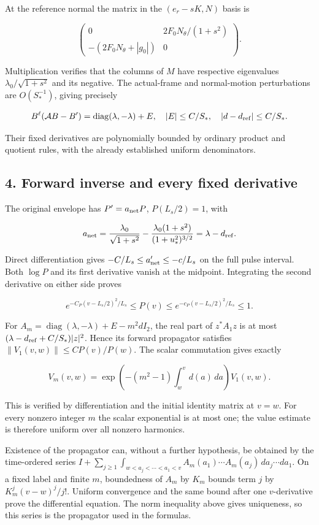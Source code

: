 \documentclass[10pt,a4paper]{article}
\begin{document}
At the reference normal the matrix in the \((e_r-sK,N)\) basis is

\[
\begin{pmatrix}0&2F_0N_\theta/(1+s^2)\\-(2F_0N_\theta+|g_0|)&0\end{pmatrix}.
\]

Multiplication verifies that the columns of \(M\) have respective eigenvalues \(\lambda_0/\sqrt{1+s^2}\) and its negative. The actual-frame and normal-motion perturbations are \(O(S_*^{-1})\), giving precisely

\[
B^\ell(\mathcal AB-B')=\operatorname{diag}(\lambda,-\lambda)+E,
\quad |E|\le C/S_*,\quad |d-d_{\rm ref}|\le C/S_*.
\]

Their fixed derivatives are polynomially bounded by ordinary product and quotient rules, with the already established uniform denominators.

\subsection{4. Forward inverse and every fixed derivative}\label{gclosure:forward-inverse-and-every-fixed-derivative}

The original envelope has \(P'=a_{\rm net}P\), \(P(L_s/2)=1\), with

\[
a_{\rm net}=\frac{\lambda_0}{\sqrt{1+s^2}}-
\frac{\lambda_0(1+s^2)}{(1+u_*^2)^{3/2}}=\lambda-d_{\rm ref}.
\]

Direct differentiation gives \(-C/L_s\le a_{\rm net}'\le-c/L_s\) on the full pulse interval. Both \(\log P\) and its first derivative vanish at the midpoint. Integrating the second derivative on either side proves

\[
e^{-C_P(v-L_s/2)^2/L_s}\le P(v)\le e^{-c_P(v-L_s/2)^2/L_s}\le1.
\]

For \(A_m=\operatorname{diag}(\lambda,-\lambda)+E-m^2dI_2\), the real part of \(z^*A_1z\) is at most \((\lambda-d_{\rm ref}+C/S_*)|z|^2\). Hence its forward propagator satisfies \(\|V_1(v,w)\|\le C P(v)/P(w)\). The scalar commutation gives exactly

\[
V_m(v,w)=\exp\left(-(m^2-1)\int_w^v d(a)\,da\right)V_1(v,w).
\]

This is verified by differentiation and the initial identity matrix at \(v=w\). For every nonzero integer \(m\) the scalar exponential is at most one; the value estimate is therefore uniform over all nonzero harmonics.

Existence of the propagator can, without a further hypothesis, be obtained by the time-ordered series \(I+\sum_{j\ge1}\int_{w<a_j<\cdots<a_1<v}A_m(a_1)\cdots A_m(a_j)\,da_j\cdots da_1\). On a fixed label and finite \(m\), boundedness of \(A_m\) by \(K_m\) bounds term \(j\) by \(K_m^j(v-w)^j/j!\). Uniform convergence and the same bound after one \(v\)-derivative prove the differential equation. The norm inequality above gives uniqueness, so this series is the propagator used in the formulas.
\end{document}
